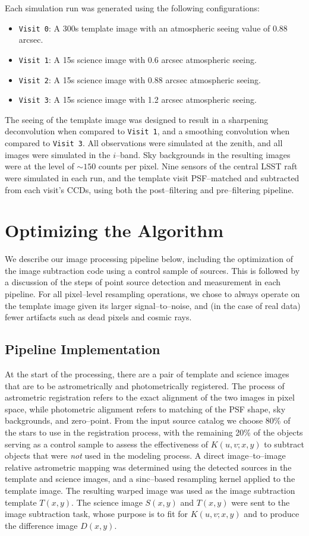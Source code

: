 \documentclass[floatfix, apj]{emulateapj}
\begin{document}
Each simulation run was generated using the following configurations:
\begin{itemize}
\item {\tt Visit 0}: A 300s template image with an atmospheric seeing value of 0.88 arcsec.
\item {\tt Visit 1}: A 15s science image with 0.6 arcsec atmospheric seeing.
\item {\tt Visit 2}: A 15s science image with 0.88 arcsec atmospheric seeing.
\item {\tt Visit 3}: A 15s science image with 1.2 arcsec atmospheric seeing.
\end{itemize}
The seeing of the template image was designed to result in a sharpening deconvolution when compared to {\tt Visit 1}, and a smoothing convolution when compared to {\tt Visit 3}.
All observations were simulated at the zenith, and all images were simulated in the $i$--band.
Sky backgrounds in the resulting images were at the level of $\sim 150$ counts per pixel.
Nine sensors of the central LSST raft were simulated in each run, and the template visit PSF--matched and subtracted from each visit's CCDs, using both the post--filtering and pre--filtering pipeline.

\section{Optimizing the Algorithm}

We describe our image processing pipeline below, including the optimization of the image subtraction code using a control sample of sources.
This is followed by a discussion of the steps of point source detection and measurement in each pipeline.
For all pixel--level resampling operations, we chose to always operate on the template image given its larger signal--to--noise, and (in the case of real data) fewer artifacts such as dead pixels and cosmic rays.

\subsection{Pipeline Implementation}

At the start of the processing, there are a pair of template and science images that are to be astrometrically and photometrically registered.
The process of astrometric registration refers to the exact alignment of the two images in pixel space, while photometric alignment refers to matching of the PSF shape, sky backgrounds, and zero--point.
From the input source catalog we choose 80\% of the stars to use in the registration process, with the remaining 20\% of the objects serving as a control sample to assess the effectiveness of $K(u,v;x,y)$ to subtract objects that were {\it not} used in the modeling process.
A direct image--to--image relative astrometric mapping was determined using the detected sources in the template and science images, and a sinc--based resampling kernel applied to the template image.
The resulting warped image was used as the image subtraction template $T(x,y)$.
The science image $S(x,y)$ and $T(x,y)$ were sent to the image subtraction task, whose purpose is to fit for $K(u,v;x,y)$ and to produce the difference image $D(x,y)$.
\end{document}

